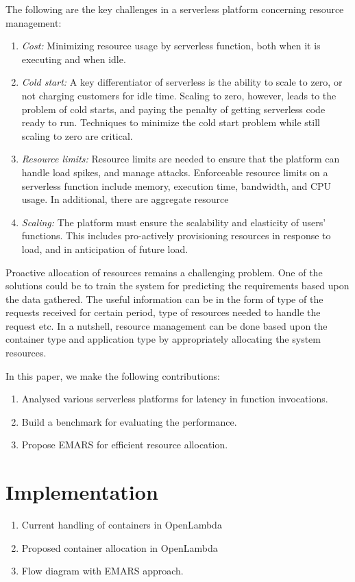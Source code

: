 \documentclass[letterpaper,twocolumn,10pt]{article}
\begin{document}
The following are the key challenges in a serverless platform concerning resource management:
\begin{enumerate}
\item {\it Cost:} Minimizing resource usage by serverless function, both when it is executing and when idle. 

\item {\it Cold start:} A key differentiator of serverless is the ability to scale to zero, or not
charging customers for idle time. Scaling to zero, however, leads to the problem
of cold starts, and paying the penalty of getting serverless code ready to run.
Techniques to minimize the cold start problem while still scaling to zero are
critical.

\item {\it Resource limits:} Resource limits are needed to ensure that the platform can handle
load spikes, and manage attacks. Enforceable resource limits on a serverless
function include memory, execution time, bandwidth, and CPU usage. In additional,
there are aggregate resource

\item {\it Scaling:} The platform must ensure the scalability and elasticity of users’ functions. This includes pro-actively provisioning resources in response to load, and
in anticipation of future load.
\end{enumerate}

Proactive allocation of resources remains a challenging problem. One of the solutions could be to train the system for predicting the requirements based upon the data gathered. The useful information can be in the form of type of the requests received for certain period, type of resources needed to handle the request etc. In a nutshell, resource management can be done based upon the container type and application type by appropriately allocating the system resources.

In this paper, we make the following contributions:
\begin{enumerate}
\item Analysed various serverless platforms for latency in function invocations.
\item Build a benchmark for evaluating the performance.
\item Propose EMARS for efficient resource allocation. 
\end{enumerate}

\section{Implementation}
\label{sec:third}
\begin{enumerate}
\item Current handling of containers in OpenLambda
\item Proposed container allocation in OpenLambda
\item Flow diagram with EMARS approach.
\end{enumerate}
\end{document}
